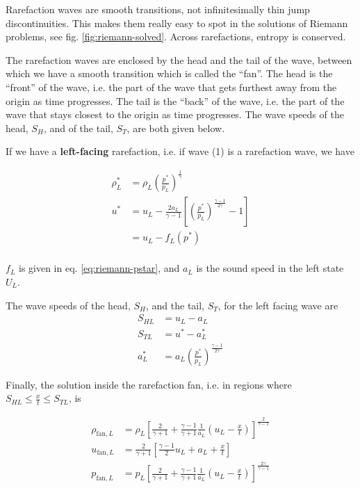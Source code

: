 Rarefaction waves are smooth transitions, not infinitesimally thin jump discontinuities.
This makes them really easy to spot in the solutions of Riemann problems, see fig. \ref{fig:riemann-solved}.
Across rarefactions, entropy is conserved.

The rarefaction waves are enclosed by the head and the tail of the wave, between which we have a smooth transition which is called the ``fan''.
The head is the ``front'' of the wave, i.e. the part of the wave that gets furthest away from the origin as time progresses.
The tail is the ``back'' of the wave, i.e. the part of the wave that stays closest to the origin as time progresses.
The wave speeds of the head, $S_H$, and of the tail, $S_T$, are both given below.


If we have a \textbf{left-facing} rarefaction, i.e. if wave (1) is a rarefaction wave, we have

\begin{align*}
	\rho^*_L &= 
		\rho_L \left( \frac{p^*}{p_L} \right) ^ \frac{1}{\gamma}\\
	u^* &= 
		u_L - \frac{2 a_L}{\gamma - 1} \left[ \left( \frac{p^*}{p_L} \right) ^ \frac{\gamma - 1}{2 \gamma} -1  \right]\\
		& = u_L - f_L(p^*) \\
\end{align*}

$f_{L}$ is given in eq. \ref{eq:riemann-pstar}, and $a_L$ is the sound speed in the left state $U_L$.


The wave speeds of the head, $S_H$, and the tail, $S_T$, for the left facing wave are
\begin{align*}
	S_{HL} &= u_L - a_L\\
	S_{TL} &= u^* - a^*_L\\
	a^*_L  &= a_L \left( \frac{p^*}{p_L} \right) ^ \frac{\gamma - 1}{2 \gamma}
\end{align*}


Finally, the solution inside the rarefaction fan, i.e. in regions where $S_{HL} \leq \frac{x}{t} \leq S_{TL}$, is 

\begin{align*}
	\rho_{\text{fan}, L} &= 
		\rho_L \left[ \frac{2}{\gamma + 1} + \frac{\gamma - 1}{\gamma + 1} \frac{1}{a_L} \left(u_L - \frac{x}{t}\right) \right] ^ \frac{2}{\gamma -1 }\\
	u_{\text{fan}, L} &= 
		\frac{2}{\gamma + 1} \left[ \frac{\gamma - 1}{2} u_L + a_L + \frac{x}{t}  \right] \\
	p_{\text{fan}, L} &= 
		p_L \left[ \frac{2}{\gamma + 1} + \frac{\gamma - 1}{\gamma + 1} \frac{1}{a_L} \left(u_L - \frac{x}{t}\right) \right] ^ \frac{2 \gamma}{\gamma -1}
\end{align*}









